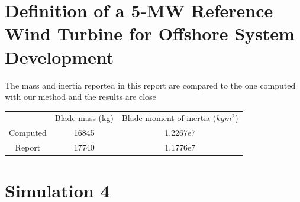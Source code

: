 \documentclass[]{article}
\begin{document}
\section{Definition of a 5-MW Reference Wind Turbine for Offshore System Development \cite{NREL_5MW_reference}}
The mass and inertia reported in this report are compared to the one computed with our method and the results are close
\begin{table}[H]
	\begin{tabular}{ccc}
		\hline
		& Blade mass (kg) & Blade moment of inertia ($kgm^2$)\\
		Computed 	& 16845	&  1.2267e7\\
		Report		& 17740 & 1.1776e7\\
		\hline
	\end{tabular}
\end{table}

\newpage
\section{Simulation 4}
\end{document}
